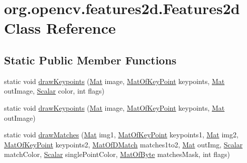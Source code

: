 \hypertarget{classorg_1_1opencv_1_1features2d_1_1_features2d}{}\section{org.\+opencv.\+features2d.\+Features2d Class Reference}
\label{classorg_1_1opencv_1_1features2d_1_1_features2d}
\subsection*{Static Public Member Functions}
\begin{DoxyCompactItemize}
\item 
static void \mbox{\hyperlink{classorg_1_1opencv_1_1features2d_1_1_features2d_a68577b64280ca50c49d9d34e8bfaf669}{draw\+Keypoints}} (\mbox{\hyperlink{classorg_1_1opencv_1_1core_1_1_mat}{Mat}} image, \mbox{\hyperlink{classorg_1_1opencv_1_1core_1_1_mat_of_key_point}{Mat\+Of\+Key\+Point}} keypoints, \mbox{\hyperlink{classorg_1_1opencv_1_1core_1_1_mat}{Mat}} out\+Image, \mbox{\hyperlink{classorg_1_1opencv_1_1core_1_1_scalar}{Scalar}} color, int flags)
\item 
static void \mbox{\hyperlink{classorg_1_1opencv_1_1features2d_1_1_features2d_a9403bc2344ad082905866d4a75fbd7b5}{draw\+Keypoints}} (\mbox{\hyperlink{classorg_1_1opencv_1_1core_1_1_mat}{Mat}} image, \mbox{\hyperlink{classorg_1_1opencv_1_1core_1_1_mat_of_key_point}{Mat\+Of\+Key\+Point}} keypoints, \mbox{\hyperlink{classorg_1_1opencv_1_1core_1_1_mat}{Mat}} out\+Image)
\item 
static void \mbox{\hyperlink{classorg_1_1opencv_1_1features2d_1_1_features2d_adcb4916fb2f74f99108f8ec9416752a9}{draw\+Matches}} (\mbox{\hyperlink{classorg_1_1opencv_1_1core_1_1_mat}{Mat}} img1, \mbox{\hyperlink{classorg_1_1opencv_1_1core_1_1_mat_of_key_point}{Mat\+Of\+Key\+Point}} keypoints1, \mbox{\hyperlink{classorg_1_1opencv_1_1core_1_1_mat}{Mat}} img2, \mbox{\hyperlink{classorg_1_1opencv_1_1core_1_1_mat_of_key_point}{Mat\+Of\+Key\+Point}} keypoints2, \mbox{\hyperlink{classorg_1_1opencv_1_1core_1_1_mat_of_d_match}{Mat\+Of\+D\+Match}} matches1to2, \mbox{\hyperlink{classorg_1_1opencv_1_1core_1_1_mat}{Mat}} out\+Img, \mbox{\hyperlink{classorg_1_1opencv_1_1core_1_1_scalar}{Scalar}} match\+Color, \mbox{\hyperlink{classorg_1_1opencv_1_1core_1_1_scalar}{Scalar}} single\+Point\+Color, \mbox{\hyperlink{classorg_1_1opencv_1_1core_1_1_mat_of_byte}{Mat\+Of\+Byte}} matches\+Mask, int flags)
\item 

\end{DoxyCompactItemize}
